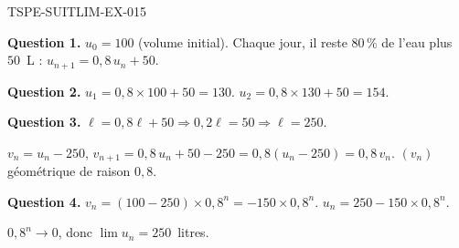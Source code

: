 \begin{corrige}{TSPE-SUITLIM-EX-015}

\textbf{Question 1.} $u_0 = 100$ (volume initial). Chaque jour, il reste $80\,\%$ de l'eau plus $50$~L : $u_{n+1} = 0{,}8\,u_n + 50$.

\textbf{Question 2.} $u_1 = 0{,}8 \times 100 + 50 = 130$. $u_2 = 0{,}8 \times 130 + 50 = 154$.

\textbf{Question 3.} $\ell = 0{,}8\ell + 50 \Rightarrow 0{,}2\ell = 50 \Rightarrow \ell = 250$.

$v_n = u_n - 250$, $v_{n+1} = 0{,}8\,u_n + 50 - 250 = 0{,}8(u_n - 250) = 0{,}8\,v_n$. $(v_n)$ géométrique de raison $0{,}8$.

\textbf{Question 4.} $v_n = (100-250) \times 0{,}8^n = -150 \times 0{,}8^n$. $u_n = 250 - 150 \times 0{,}8^n$.

$0{,}8^n \to 0$, donc $\boxed{\lim u_n = 250}$~litres.

\end{corrige}
